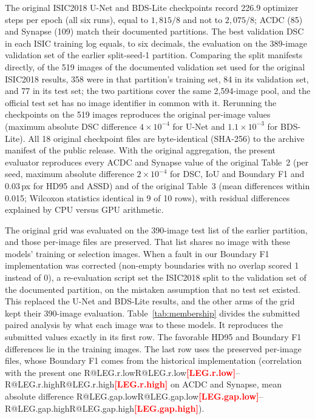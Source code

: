 \documentclass[10pt]{article}
\makeatletter
\newcommand{\R}[1]{\ifcsname R@#1\endcsname\csname R@#1\endcsname\else\textbf{\textcolor{red}{[#1]}}\fi}
\renewcommand\paragraph{\@startsection{paragraph}{4}{\z@}{1.6ex \@plus .5ex \@minus .2ex}{-1em}{\normalfont\normalsize\bfseries}}
\newcommand{\fitwidth}[1]{\sbox{\fitbox}{#1}\ifdim\wd\fitbox>\linewidth\resizebox{\linewidth}{!}{\usebox{\fitbox}}\else\usebox{\fitbox}\fi}
\makeatother
\begin{document}
\paragraph{Evidence.} The original ISIC2018 U-Net and BDS-Lite checkpoints record 226.9 optimizer steps per epoch (all six runs), equal to $1{,}815/8$ and not to $2{,}075/8$; ACDC (85) and Synapse (109) match their documented partitions. The best validation DSC in each ISIC training log equals, to six decimals, the evaluation on the 389-image validation set of the earlier split-seed-1 partition. Comparing the split manifests directly, of the 519 images of the documented validation set used for the original ISIC2018 results, 358 were in that partition's training set, 84 in its validation set, and 77 in its test set; the two partitions cover the same 2,594-image pool, and the official test set has no image identifier in common with it. Rerunning the checkpoints on the 519 images reproduces the original per-image values (maximum absolute DSC difference $4\times10^{-4}$ for U-Net and $1.1\times10^{-3}$ for BDS-Lite). All 18 original checkpoint files are byte-identical (SHA-256) to the archive manifest of the public release. With the original aggregation, the present evaluator reproduces every ACDC and Synapse value of the original Table~2 (per seed, maximum absolute difference $2\times10^{-4}$ for DSC, IoU and Boundary F1 and 0.03\,px for HD95 and ASSD) and of the original Table~3 (mean differences within 0.015; Wilcoxon statistics identical in 9 of 10 rows), with residual differences explained by CPU versus GPU arithmetic.

\paragraph{How the error arose.} The original grid was evaluated on the 390-image test list of the earlier partition, and those per-image files are preserved. That list shares no image with these models' training or selection images. When a fault in our Boundary F1 implementation was corrected (non-empty boundaries with no overlap scored 1 instead of 0), a re-evaluation script set the ISIC2018 split to the validation set of the documented partition, on the mistaken assumption that no test set existed. This replaced the U-Net and BDS-Lite results, and the other arms of the grid kept their 390-image evaluation. Table~\ref{tab:membership} divides the submitted paired analysis by what each image was to these models. It reproduces the submitted values exactly in its first row. The favorable HD95 and Boundary F1 differences lie in the training images. The last row uses the preserved per-image files, whose Boundary F1 comes from the historical implementation (correlation with the present one \R{LEG.r.low}--\R{LEG.r.high} on ACDC and Synapse, mean absolute difference \R{LEG.gap.low}--\R{LEG.gap.high}).
\begin{table}[!htbp]\centering
\fitwidth{}
\caption{\label{tab:membership}BDS-Lite minus U-Net, original ISIC2018 models, seed-averaged paired differences with 95\% bootstrap intervals over images, positive favoring BDS-Lite. Post hoc.}
\end{table}
\end{document}
